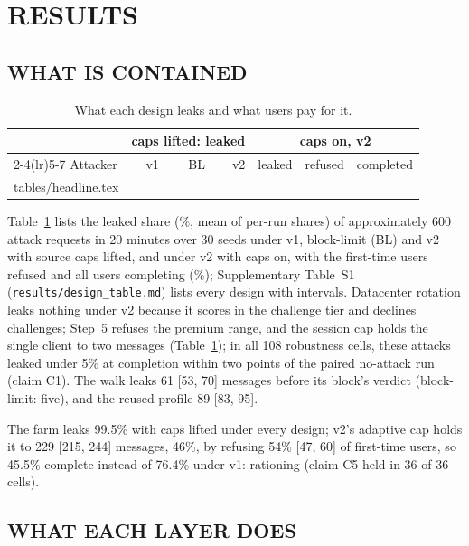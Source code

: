 \documentclass{IEEEoj}
\makeatletter
\newcommand{\tablerows}[1]{\@@input #1 }         %
\makeatother
\begin{document}
\section{RESULTS}
\label{sec:results}

\subsection{WHAT IS CONTAINED}
\label{sec:rq1}

\begin{table}[!t]
\caption{What each design leaks and what users pay for it.}
\label{tab:headline}
\footnotesize
\setlength{\tabcolsep}{2.8pt}
\begin{tabular*}{\columnwidth}{@{\extracolsep{\fill}}lrrrrrr@{}}
\toprule
& \multicolumn{3}{c}{caps lifted: leaked} & \multicolumn{3}{c}{caps on, v2} \\
\cmidrule(lr){2-4}\cmidrule(lr){5-7}
Attacker & v1 & BL & v2 & leaked & refused & completed \\
\midrule
\tablerows{tables/headline.tex}
\bottomrule
\end{tabular*}
\end{table}

Table~\ref{tab:headline} lists the leaked share (\%, mean of per-run shares) of approximately 600 attack requests in 20 minutes over 30 seeds under v1, block-limit (BL) and v2 with source caps lifted, and under v2 with caps on, with the first-time users refused and all users completing (\%); Supplementary Table~S1 (\texttt{results/\allowbreak design\_table.md}) lists every design with intervals. Datacenter rotation leaks nothing under v2 because it scores in the challenge tier and declines challenges; Step~5 refuses the premium range, and the session cap holds the single client to two messages (Table~\ref{tab:headline}); in all 108 robustness cells, these attacks leaked under 5\% at completion within two points of the paired no-attack run (claim C1). The walk leaks 61 [53, 70] messages before its block's verdict (block-limit: five), and the reused profile 89 [83, 95].


The farm leaks 99.5\% with caps lifted under every design; v2's adaptive cap holds it to 229 [215, 244] messages, 46\%, by refusing 54\% [47, 60] of first-time users, so 45.5\% complete instead of 76.4\% under v1: rationing (claim C5 held in 36 of 36 cells).

\subsection{WHAT EACH LAYER DOES}
\label{sec:rq2}
\end{document}
